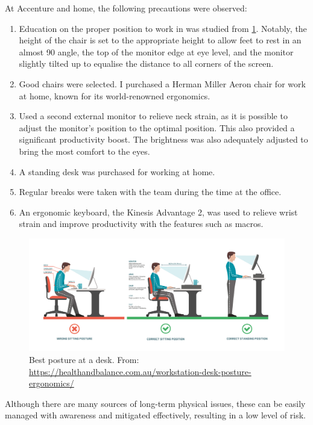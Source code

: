 At Accenture and home, the following precautions were observed:
\begin{enumerate}
  \item Education on the proper position to work in was studied from \ref{fig:posture_desk}. Notably, the height of the chair is set to the appropriate height to allow feet to rest in an almost \SI{90}{\deg} angle, the top of the monitor edge at eye level, and the monitor slightly tilted up to equalise the distance to all corners of the screen. 
  \item Good chairs were selected. I purchased a Herman Miller Aeron chair for work at home, known for its world-renowned ergonomics. 
  \item Used a second external monitor to relieve neck strain, as it is possible to adjust the monitor's position to the optimal position. This also provided a significant productivity boost. The brightness was also adequately adjusted to bring the most comfort to the eyes. 
  \item A standing desk was purchased for working at home. 
  \item Regular breaks were taken with the team during the time at the office. 
  \item An ergonomic keyboard, the Kinesis Advantage 2, was used to relieve wrist strain and improve productivity with the features such as macros. 
\end{enumerate}

\begin{figure}[H]
  \centering
  \includegraphics[width=\textwidth]{posture_desk.jpeg}
  \caption[Best posture at a desk.]{Best posture at a desk. From: \url{https://healthandbalance.com.au/workstation-desk-posture-ergonomics/}}
  \label{fig:posture_desk}
\end{figure}

Although there are many sources of long-term physical issues, these can be easily managed with awareness and mitigated effectively, resulting in a low level of risk. 

